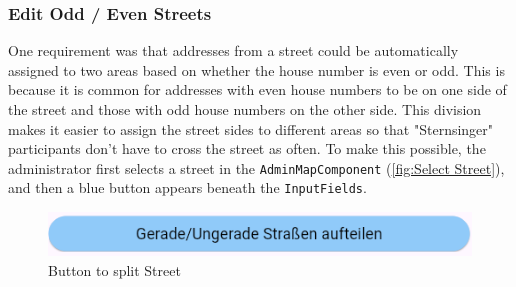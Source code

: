 \newpage


\subsubsection{Edit Odd / Even Streets}
One requirement was that addresses from a street could be automatically assigned to two areas based on whether the house number is even or odd. This is because it is common for addresses with even house numbers to be on one side of the street and those with odd house numbers on the other side. This division makes it easier to assign the street sides to different areas so that "Sternsinger" participants don't have to cross the street as often.\blankLine 
To make this possible, the administrator first selects a street in the \texttt{AdminMapComponent} (\ref{fig:Select Street}), and then a blue button appears beneath the \texttt{InputFields}.
\begin{figure}[H]
    \centering
    \includegraphics[width=0.6\linewidth]{images/AdminPanel/splitStreetButton.png}
    \caption{Button to split Street}
\end{figure}

